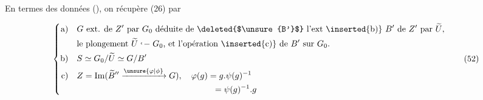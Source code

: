 En termes des données (), on récupère (26) par

\[
\left\{\begin{aligned}
\text{a)}\quad&G\ \text{ext. de $Z'$ par $G_0$ déduite de \deleted{$\unsure{B'}$} l'ext \inserted{b)} $B'$ de $Z'$ par $\widetilde U$,}\\
 &\text{le plongement $\widetilde U\mathrel{\lhook\joinrel-}G_0$, et l'opération \inserted{c)} de $B'$ sur $G_0$.}\\
\text{b)}\quad&S\simeq G_0/\widetilde U\simeq G/B'\\
\text{c)}\quad&Z=\operatorname{Im}(\widetilde B''\xrightarrow{\unsure{\varphi|\phi}}G),\quad\varphi(g)=g.\psi(g)^{-1}\\
 &\hspace{16em}=\psi(g)^{-1}.g
\end{aligned}\right.\tag*{(52)}
\]



